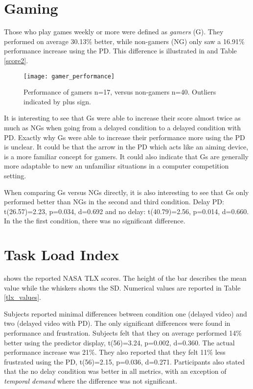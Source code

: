 \section{Gaming}

Those who play games weekly or more were defined as \emph{gamers} (G). They performed on average 30.13\% better, while non-gamers (NG) only saw a 16.91\% performance increase using the PD. This difference is illustrated in  and Table \ref{score2}.

\begin{figure}[h!]
	\vspace{-3mm}
    \centering
    \texttt{[image: gamer\_performance]}
	\vspace{-3mm}
    \caption{Performance of gamers n=17, versus non-gamers n=40. Outliers indicated by plus sign.}
    \label{gamer_performance}
	\vspace{-4mm}
\end{figure}

It is interesting to see that Gs were able to increase their score almost twice as much as NGs when going from a delayed condition to a delayed condition with PD. Exactly why Gs were able to increase their performance more using the PD is unclear. It could be that the arrow in the PD which acts like an aiming device, is a more familiar concept for gamers. It could also indicate that Gs are generally more adaptable to new an unfamiliar situations in a computer competition setting.

When comparing Gs versus NGs directly, it is also interesting to see that Gs only performed better than NGs in the second and third condition. Delay PD: t(26.57)=2.23, p=0.034, d=0.692 and no delay: t(40.79)=2.56, p=0.014, d=0.660. In the the first condition, there was no significant difference.

\section{Task Load Index}

 shows the reported NASA TLX scores. The height of the bar describes the mean value while the whiskers shows the SD. Numerical values are reported in Table \ref{tlx_values}.

Subjects reported minimal differences between condition one (delayed video) and two (delayed video with PD). The only significant differences were found in performance and frustration. Subjects felt that they on average performed 14\% better using the predictor display, t(56)=3.24, p=0.002, d=0.360. The actual performance increase was 21\%. They also reported that they felt 11\% less frustrated using the PD, t(56)=2.15, p=0.036, d=0.271. Participants also stated that the no delay condition was better in all metrics, with an exception of \emph{temporal demand} where the difference was not significant.

